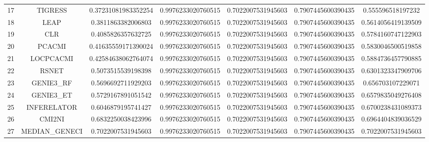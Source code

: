 \documentclass[a4paper,10pt]{article}
\begin{document}
\begin{landscape}
\begin{table}[!htp]
\begin{tabular}{ccccccc}
17&TIGRESS&0.37231081983352254&0.9976233020760515&0.7022007531945603&0.7907445600390435&0.555596518197232\\
18&LEAP&0.3811863382006803&0.9976233020760515&0.7022007531945603&0.7907445600390435&0.5614056419139509\\
19&CLR&0.4085826357632725&0.9976233020760515&0.7022007531945603&0.7907445600390435&0.5784160747122903\\
20&PCACMI&0.41635559171390024&0.9976233020760515&0.7022007531945603&0.7907445600390435&0.5830046500519858\\
21&LOCPCACMI&0.42584638062764074&0.9976233020760515&0.7022007531945603&0.7907445600390435&0.5884736457790885\\
22&RSNET&0.5073515539198398&0.9976233020760515&0.7022007531945603&0.7907445600390435&0.6301323347909706\\
23&GENIE3_RF&0.5696692711929203&0.9976233020760515&0.7022007531945603&0.7907445600390435&0.656703107229071\\
24&GENIE3_ET&0.5729167891051542&0.9976233020760515&0.7022007531945603&0.7907445600390435&0.6579835049276408\\
25&INFERELATOR&0.6046879195741427&0.9976233020760515&0.7022007531945603&0.7907445600390435&0.6700238431089373\\
26&CMI2NI&0.6832250038423996&0.9976233020760515&0.7022007531945603&0.7907445600390435&0.6964404839036529\\
27&MEDIAN_GENECI&0.7022007531945603&0.9976233020760515&0.7022007531945603&0.7907445600390435&0.7022007531945603\\
\hline
\end{tabular}
\end{table}

\end{landscape}
\end{document}
